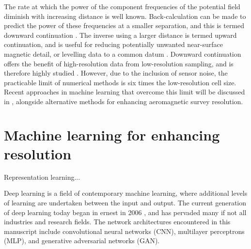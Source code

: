 \documentclass[manuscript.tex]{subfiles}
\begin{document}
The rate at which the power of the component frequencies of the potential field diminish with increasing distance is well known.
Back-calculation can be made to predict the power of these frequencies at a smaller separation, and this is termed downward continuation \textcite{bullardDeterminationMassesNecessary1948,blakelyPotentialTheoryGravity1996}.
The inverse using a larger distance is termed upward continuation, and is useful for reducing potentially unwanted near-surface magnetic detail, or levelling data to a common datum \parencite[e.g.\ open file magnetic data in Australia is available levelled to AWAGS][]{mintyAirborneGeophysicalMapping2011}.
Downward continuation offers the benefit of high-resolution data from low-resolution sampling, and is therefore highly studied \parencite{zuoDownwardContinuationTransformation2020,liStableDownwardContinuation2023,fediStableDownwardContinuation2002,yeHighprecisionDownwardContinuation2022,zhangNumericalSolutionsMeanValue2018a,guoPotentialFieldContinuation2020,gangImprovedStableDownward2018,pilkingtonPotentialFieldContinuation2017}.
However, due to the inclusion of sensor noise, the practicable limit of numerical methods is six times the low-resolution cell size.
Recent approaches in machine learning that overcome this limit will be discussed in , alongside alternative methods for enhancing aeromagnetic survey resolution.

\section{Machine learning for enhancing resolution}
Representation learning...


\label{sec:introml}
Deep learning is a field of contemporary machine learning, where additional levels of learning are undertaken between the input and output.
The current generation of deep learning today began in ernest in 2006 \parencite[as defined by][]{dengDeepLearningMethods2014,Goodfellow-et-al-2016}, and has pervaded many if not all industries and research fields.
The network architectures encountered in this manuscript include convolutional neural networks (CNN), multilayer perceptrons (MLP), and generative adversarial networks (GAN).
\end{document}
